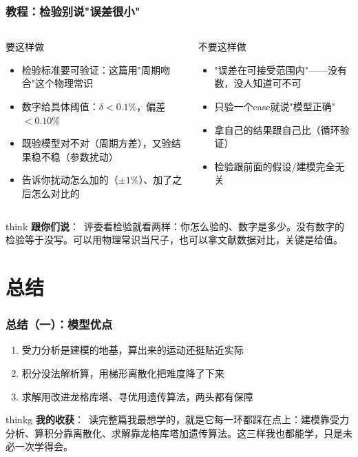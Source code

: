 \documentclass[aspectratio=169]{beamer}
\newcommand{\remark}[2]{%
	\vspace{0.12cm}%
	\begin{beamercolorbox}[rounded=true,sep=6pt]{think}%
		{\color{orchidpurple}\textbf{#1}：}~#2%
	\end{beamercolorbox}%
}
\newcommand{\remarkg}[2]{%
	\vspace{0.12cm}%
	\begin{beamercolorbox}[rounded=true,sep=6pt]{thinkg}%
		{\color{orchidgold}\textbf{#1}：}~#2%
	\end{beamercolorbox}%
}
\begin{document}
\begin{frame}
	\frametitle{教程：检验别说"误差很小"}
	\scriptsize
	\begin{columns}[T]
		\begin{exampleblock}{要这样做}
			\begin{itemize}
				\item 检验标准要可验证：这篇用"周期吻合"这个物理常识
				\item 数字给具体阈值：$\delta<0.1\%$，偏差$<0.10\%$
				\item 既验模型对不对（周期方差），又验结果稳不稳（参数扰动）
				\item 告诉你扰动怎么加的（$\pm1\%$）、加了之后怎么对比的
			\end{itemize}
		\end{exampleblock}
		\begin{alertblock}{不要这样做}
			\begin{itemize}
				\item "误差在可接受范围内"——没有数，没人知道可不可
				\item 只验一个case就说"模型正确"
				\item 拿自己的结果跟自己比（循环验证）
				\item 检验跟前面的假设/建模完全无关
			\end{itemize}
		\end{alertblock}
	\end{columns}
	\remark{跟你们说}{评委看检验就看两样：你怎么验的、数字是多少。没有数字的检验等于没写。可以用物理常识当尺子，也可以拿文献数据对比，关键是给值。}
\end{frame}

\section{总结}
\begin{frame}
	\frametitle{总结（一）：模型优点}
	\scriptsize
	\begin{enumerate}
		\item 受力分析是建模的地基，算出来的运动还挺贴近实际
		\item 积分没法解析算，用梯形离散化把难度降了下来
		\item 求解用改进龙格库塔、寻优用遗传算法，两头都有保障
	\end{enumerate}
	\remarkg{我的收获}{读完整篇我最想学的，就是它每一环都踩在点上：建模靠受力分析、算积分靠离散化、求解靠龙格库塔加遗传算法。这三样我也都能学，只是未必一次学得会。}
\end{frame}
\end{document}
